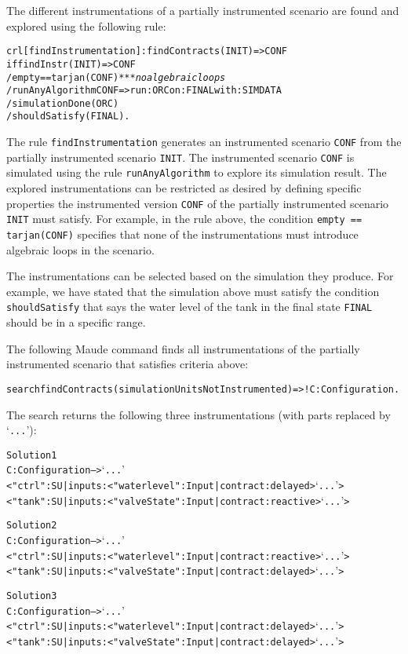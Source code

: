 The different instrumentations of a partially instrumented scenario are found and explored using the following rule:

\small
\begin{alltt}
crl [findInstrumentation]: findContracts(INIT) => CONF
    if findInstr(INIT) => CONF
    / empty == tarjan(CONF)            *** \emph{no algebraic loops}
    / runAnyAlgorithm CONF => run: ORC on: FINAL with: SIMDATA
    / simulationDone(ORC)
    / shouldSatisfy(FINAL) .
  \end{alltt}
\normalsize

\noindent The rule \texttt{findInstrumentation} generates an instrumented scenario \texttt{CONF} from the partially instrumented scenario \texttt{INIT}.
The instrumented scenario \texttt{CONF} is simulated using the rule \texttt{runAnyAlgorithm} to explore its simulation result.
The explored instrumentations can be restricted as desired by defining specific properties the instrumented version \texttt{CONF} of the partially instrumented scenario \texttt{INIT} must satisfy.
For example, in the rule above, the condition \texttt{empty == tarjan(CONF)} specifies that none of the instrumentations must introduce algebraic loops in the scenario.

The instrumentations can be selected based on the simulation they produce. 
For example, we have stated that the simulation above must satisfy the condition \texttt{shouldSatisfy} that says the water level of the tank in the final state \texttt{FINAL} should be in a specific range.

\begin{example}
  The following Maude command finds all instrumentations of the partially instrumented scenario that satisfies criteria above: 

\small
\begin{alltt}
search findContracts(simulationUnitsNotInstrumented) =>! C:Configuration .
\end{alltt}
\normalsize

The search returns the following three instrumentations (with parts replaced by `\texttt{...}'):

\scriptsize
\begin{alltt}
Solution 1
C:Configuration --> `...'
< "ctrl" : SU | inputs : < "waterlevel" : Input | contract : delayed > `...' >
< "tank" : SU | inputs : < "valveState" : Input | contract : reactive > `...' >

Solution 2
C:Configuration --> `...'
< "ctrl" : SU | inputs : < "waterlevel" : Input | contract : reactive > `...' >
< "tank" : SU | inputs : < "valveState" : Input | contract : delayed > `...' >

Solution 3
C:Configuration --> `...'
< "ctrl" : SU | inputs : < "waterlevel" : Input | contract : delayed > `...' >
< "tank" : SU | inputs : < "valveState" : Input | contract : delayed > `...' >

\end{alltt}
\normalsize

\end{example}

